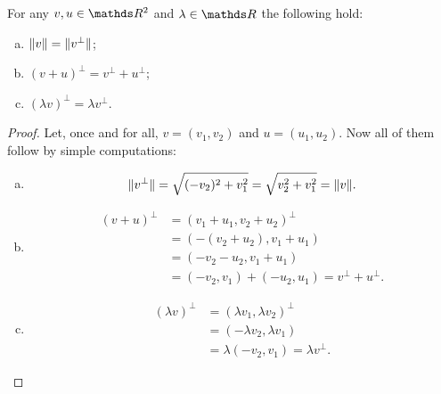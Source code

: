 \begin{prop}
	For any $v,u\in \R^2$ and $\lambda \in \R$ the following hold:
	
	\begin{enumerate}[a)]
		\item $\lVert v\rVert=\lVert v^\perp\rVert$;
		\item $(v+u)^\perp=v^\perp+u^\perp$;
		\item $(\lambda v)^\perp=\lambda v^\perp$.
	\end{enumerate}
\end{prop}
\begin{proof}
	Let, once and for all, $v=(v_1,v_2)$ and $u=(u_1,u_2)$. Now all of them follow by simple computations:
	\begin{enumerate}[a)]
		\item \[\lVert v^\perp\rVert=\sqrt{(-v_2)^2+v_1^2}=\sqrt{v_2^2+v_1^2}=\lVert v\rVert.\]
		
		\item
		\begin{align*}
			(v+u)^\perp&=(v_1+u_1,v_2+u_2)^\perp\\
			&=(-(v_2+u_2),v_1+u_1)\\
			&=(-v_2-u_2,v_1+u_1)\\
			&=(-v_2,v_1)+(-u_2,u_1)=v^\perp+u^\perp.
		\end{align*}
		
		\item
		\begin{align*}
			(\lambda v)^\perp&=(\lambda v_1,\lambda v_2)^\perp\\
			&=(-\lambda v_2,\lambda v_1)\\
			&=\lambda(-v_2,v_1)=\lambda v^\perp.
		\end{align*}
	\end{enumerate}
\end{proof}

